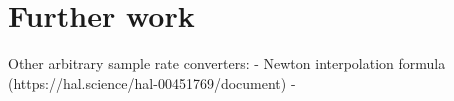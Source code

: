 \chapter{Further work}
\label{chap:further_work}

Other arbitrary sample rate converters:
-  Newton interpolation formula (https://hal.science/hal-00451769/document)
- 